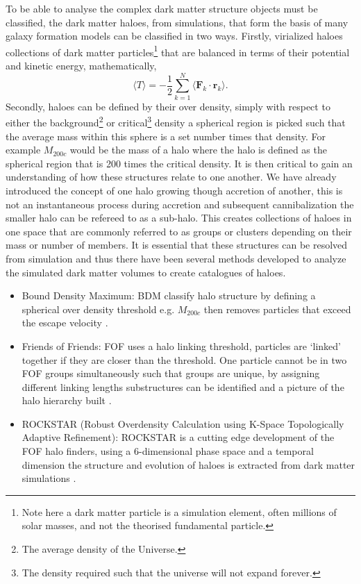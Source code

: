To be able to analyse the complex dark matter structure objects must be classified, the dark matter haloes, from simulations, that form the basis of many galaxy formation models can be classified in two ways. Firstly, virialized haloes collections of dark matter particles\footnote{Note here a dark matter particle is a simulation element, often millions of solar masses, and not the theorised fundamental particle.} that are balanced in terms of their potential and kinetic energy, mathematically, 
\begin{equation}
    \langle T \rangle = -\frac{1}{2}\sum^{N}_{k=1}\langle \mathbf{F}_k \cdot \mathbf{r}_k \rangle.
\end{equation}
Secondly, haloes can be defined by their over density, simply with respect to either the background\footnote{The average density of the Universe.} or critical\footnote{The density required such that the universe will not expand forever.} density a spherical region is picked such that the average mass within this sphere is a set number times that density. For example $M_{200c}$ would be the mass of a halo where the halo is defined as the spherical region that is 200 times the critical density. It is then critical to gain an understanding of how these structures relate to one another. We have already introduced the concept of one halo growing though accretion of another, this is not an instantaneous process during accretion and subsequent cannibalization the smaller halo can be refereed to as a sub-halo. This creates collections of haloes in one space that are commonly referred to as groups or clusters depending on their mass or number of members. It is essential that these structures can be resolved from simulation and thus there have been several methods developed to analyze the simulated dark matter volumes to create catalogues of haloes. 

\begin{itemize}
    \item Bound Density Maximum: BDM classify halo structure by defining a spherical over density threshold e.g. $M_{200c}$ then removes particles that exceed the escape velocity \citep{Klypin1997Particle-MeshSimulations}.
    \item Friends of Friends: FOF uses a halo linking threshold, particles are `linked' together if they are closer than the threshold. One particle cannot be in two FOF groups simultaneously such that groups are unique, by assigning different linking lengths substructures can be identified and a picture of the halo hierarchy built \citep{Davis1985THEMATTER}.
    \item ROCKSTAR (Robust Overdensity Calculation using K-Space Topologically Adaptive Refinement): ROCKSTAR is a cutting edge development of the FOF halo finders, using a 6-dimensional phase space and a temporal dimension the structure and evolution of haloes is extracted from dark matter simulations \citep{Behroozi2013TheCores}.
\end{itemize}

